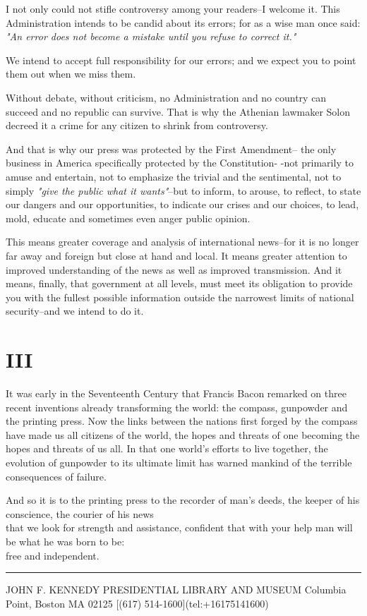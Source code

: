 \documentclass{article}
\begin{document}
I not only could not stifle controversy among your readers--I welcome it. This Administration intends to be candid about its errors; for as a wise man once said: \emph{"An error does not become a mistake until you refuse to correct it."}

We intend to accept full responsibility for our errors; and we expect you to point them out when we miss them.

Without debate, without criticism, no Administration and no country can succeed and no republic can survive. 
That is why the Athenian lawmaker Solon decreed it a crime for any citizen to shrink from controversy. 

And that is why our press was protected by the First Amendment-- the only business in America specifically protected by the Constitution- -not primarily to amuse and entertain, not to emphasize the trivial and the sentimental, not to simply \emph{"give the public what it wants"}--but to inform, to arouse, to reflect, to state our dangers and our opportunities, to indicate our crises and our choices, to lead, mold, educate and sometimes even anger public opinion.

This means greater coverage and analysis of international news--for it is no longer far away and foreign but close at hand and local. It means greater attention to improved understanding of the news as well as improved transmission. And it means, finally, that government at all levels, must meet its obligation to provide you with the fullest possible information outside the narrowest limits of national security--and we intend to do it.

\section*{III}

It was early in the Seventeenth Century that Francis Bacon remarked on three recent inventions already transforming the world: the compass, gunpowder and the printing press. Now the links between the nations first forged by the compass have made us all citizens of the world, the hopes and threats of one becoming the hopes and threats of us all. In that one world's efforts to live together, the evolution of gunpowder to its ultimate limit has warned mankind of the terrible consequences of failure.

And so it is to the printing press to the recorder of man's deeds, the keeper of his conscience, the courier of his news \\
that we look for strength and assistance, confident that with your help man will be what he was born to be: \\
free and independent.

\hrule

JOHN F. KENNEDY PRESIDENTIAL LIBRARY AND MUSEUM  
Columbia Point, Boston MA 02125 [(617) 514-1600](tel:+16175141600)
\end{document}
